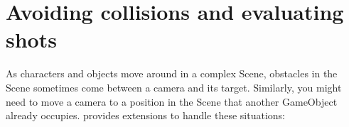 \chapter{Avoiding collisions and evaluating shots}
\hypertarget{md__hey_tea_9_2_library_2_package_cache_2com_8unity_8cinemachine_0d2_89_87_2_documentation_0i_2_cinemachine_collider_confiner}{}\label{md__hey_tea_9_2_library_2_package_cache_2com_8unity_8cinemachine_0d2_89_87_2_documentation_0i_2_cinemachine_collider_confiner}
\label{md__hey_tea_9_2_library_2_package_cache_2com_8unity_8cinemachine_0d2_89_87_2_documentation_0i_2_cinemachine_collider_confiner_autotoc_md666}%
%
 As characters and objects move around in a complex Scene, obstacles in the Scene sometimes come between a camera and its target. Similarly, you might need to move a camera to a position in the Scene that another Game\+Object already occupies.  provides extensions to handle these situations\+:


\begin{DoxyItemize}
\item {}
\item {} 
\end{DoxyItemize}